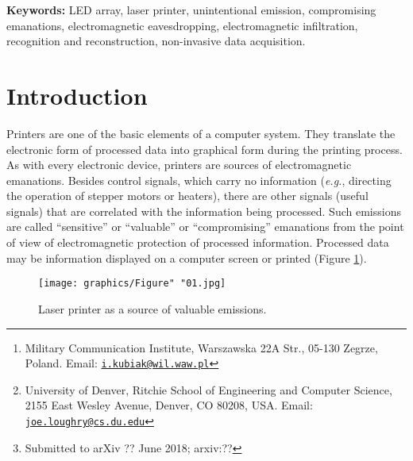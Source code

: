 \documentclass[letterpaper,journal]{ieeetran}
\begin{document}
\title{}

\author{Ireneusz Kubiak
    and Joe Loughry %
\thanks{Military Communication Institute,
Warszawska 22A Str., 05-130 Zegrze, Poland. Email:
\href{mailto:i.kubiak@wil.waw.pl}{\nolinkurl{i.kubiak@wil.waw.pl}}}
\thanks{University of Denver, Ritchie School of
Engineering and Computer Science, 2155 East Wesley Avenue, Denver, CO 80208,
USA. Email:
\href{mailto:joe.loughry@cs.du.edu}{\nolinkurl{joe.loughry@cs.du.edu}}}
\thanks{Submitted to arXiv ?? June 2018; arxiv:??}}

\date{}

\maketitle


\begin{abstract}
	
\end{abstract}

\textbf{Keywords:} LED array, laser printer, unintentional emission,
compromising emanations, electromagnetic eavesdropping, electromagnetic
infiltration, recognition and reconstruction, non-invasive data acquisition.

\IEEEpeerreviewmaketitle

\section{Introduction}

Printers are one of the basic elements of a computer system. They translate
the electronic form of processed data into graphical form during the printing
process. As with every electronic device, printers are sources of
electromagnetic emanations. Besides control signals, which carry no
information ({\it e.g.}, directing the operation of stepper motors or
heaters), there are other signals (useful signals) that are correlated with
the information being processed. Such emissions are called ``sensitive'' or
``valuable'' or ``compromising'' emanations from the point of view of
electromagnetic protection of processed information. Processed data may
be information displayed on a computer screen or printed (Figure
\ref{figure:Figure_01}).

\begin{figure}[ht]
    \centering
    \texttt{[image: graphics/Figure" "01.jpg]}
    \caption{Laser printer as a source of valuable emissions.}
    \label{figure:Figure_01}
\end{figure}
\end{document}
